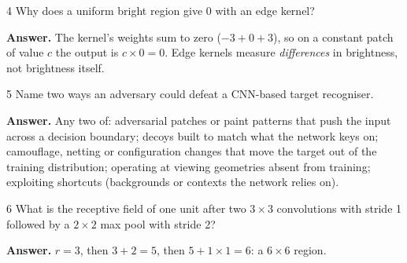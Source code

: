 \documentclass[11pt]{article}
\begin{document}
\begin{question}{4}
Why does a uniform bright region give 0 with an edge kernel?
\end{question}
\textbf{Answer.} The kernel's weights sum to zero ($-3+0+3$), so on a constant patch of value $c$ the output is $c\times0=0$. Edge kernels measure \emph{differences} in brightness, not brightness itself.

\begin{question}{5}
Name two ways an adversary could defeat a CNN-based target recogniser.
\end{question}
\textbf{Answer.} Any two of: adversarial patches or paint patterns that push the input across a decision boundary; decoys built to match what the network keys on; camouflage, netting or configuration changes that move the target out of the training distribution; operating at viewing geometries absent from training; exploiting shortcuts (backgrounds or contexts the network relies on).

\begin{question}{6}
What is the receptive field of one unit after two $3\times3$ convolutions with stride 1 followed by a $2\times2$ max pool with stride 2?
\end{question}
\textbf{Answer.} $r=3$, then $3+2=5$, then $5+1\times1=6$: a $6\times6$ region.
\end{document}
